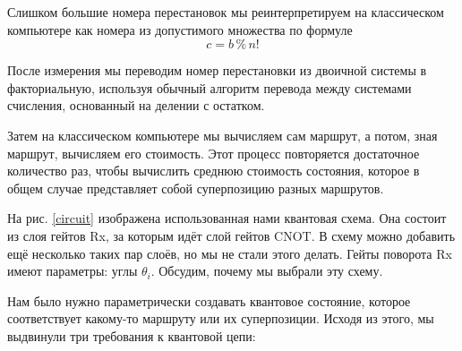 Слишком большие номера перестановок мы реинтерпретируем на классическом компьютере как номера из допустимого множества по формуле
$$c = b \mathbin{\%} n!$$

После измерения мы переводим номер перестановки из двоичной системы в факториальную, используя обычный алгоритм перевода между системами счисления, основанный на делении с остатком.

Затем на классическом компьютере мы вычисляем сам маршрут, а потом, зная маршрут, вычисляем его стоимость. Этот процесс повторяется достаточное количество раз, чтобы вычислить среднюю стоимость состояния, которое в общем случае представляет собой суперпозицию разных маршрутов.





На рис. \ref{circuit} изображена использованная нами квантовая схема. Она состоит из слоя гейтов Rx, за которым идёт слой гейтов CNOT. 
В схему можно добавить ещё несколько таких пар слоёв, но мы не стали этого делать.
Гейты поворота Rx имеют параметры: углы $\theta_i$. Обсудим, почему мы выбрали эту схему.


Нам было нужно параметрически создавать квантовое состояние, которое соответствует какому-то маршруту или их суперпозиции. Исходя из этого, мы выдвинули три требования к квантовой цепи:

